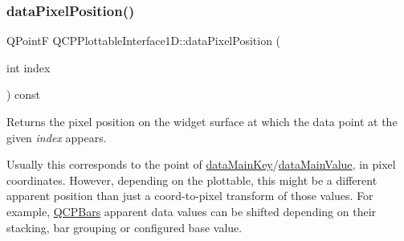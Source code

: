 \mbox{\label{class_q_c_p_plottable_interface1_d_a78911838cfbcfd2d8df9ad2fdbfb8e93}} 
\subsubsection{\texorpdfstring{data\+Pixel\+Position()}{dataPixelPosition()}}
{\footnotesize\ttfamily Q\+PointF Q\+C\+P\+Plottable\+Interface1\+D\+::data\+Pixel\+Position (\begin{DoxyParamCaption}\item[{int}]{index }\end{DoxyParamCaption}) const\hspace{0.3cm}{\ttfamily [pure virtual]}}

Returns the pixel position on the widget surface at which the data point at the given {\itshape index} appears.

Usually this corresponds to the point of \hyperlink{class_q_c_p_plottable_interface1_d_a2bd60daaac046945fead558cbd83cf73}{data\+Main\+Key}/\hyperlink{class_q_c_p_plottable_interface1_d_af6330919e8023277d08c958a6074fc76}{data\+Main\+Value}, in pixel coordinates. However, depending on the plottable, this might be a different apparent position than just a coord-\/to-\/pixel transform of those values. For example, \hyperlink{class_q_c_p_bars}{Q\+C\+P\+Bars} apparent data values can be shifted depending on their stacking, bar grouping or configured base value. 

